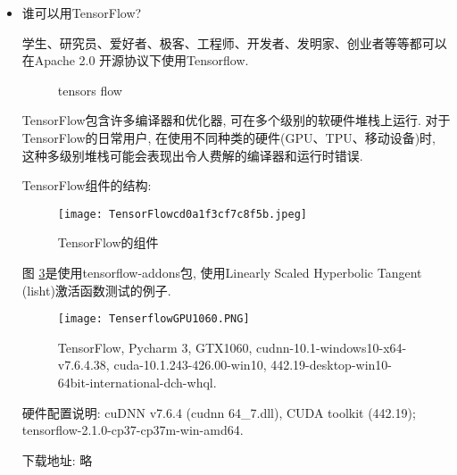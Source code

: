 \begin{itemize}
\item 谁可以用TensorFlow?
\begin{remark}
学生、研究员、爱好者、极客、工程师、开发者、发明家、创业者等等都可以在Apache 2.0 开源协议下使用Tensorflow.
\begin{figure}[H]
\centering
{}
\caption{tensors flow}
\label{20161021131748099}
\end{figure}
TensorFlow包含许多编译器和优化器, 可在多个级别的软硬件堆栈上运行. 对于 TensorFlow的日常用户, 在使用不同种类的硬件(GPU、TPU、移动设备)时, 这种多级别堆栈可能会表现出令人费解的编译器和运行时错误.
\end{remark}

TensorFlow组件的结构:
\begin{figure}[H]
	\centering
	\texttt{[image: TensorFlowcd0a1f3cf7c8f5b.jpeg]}
	\caption{TensorFlow的组件}
   \label{TensorFlowcd0a1f3cf7c8f5b}
\end{figure}

图 \ref{TenserflowGPU1060}是使用tensorflow-addons包, 使用Linearly Scaled Hyperbolic Tangent (lisht)激活函数测试的例子.
\begin{figure}[H]
\begin{center}
\texttt{[image: TenserflowGPU1060.PNG]}
\caption{TensorFlow, Pycharm 3, GTX1060, cudnn-10.1-windows10-x64-v7.6.4.38, cuda-10.1.243-426.00-win10, 442.19-desktop-win10-64bit-international-dch-whql.}
\label{TenserflowGPU1060}
\end{center}
\end{figure}
\begin{remark}
硬件配置说明: cuDNN v7.6.4 (cudnn 64\_7.dll), CUDA toolkit (442.19); tensorflow-2.1.0-cp37-cp37m-win-amd64.

下载地址: 略


\end{remark}
\end{itemize}
